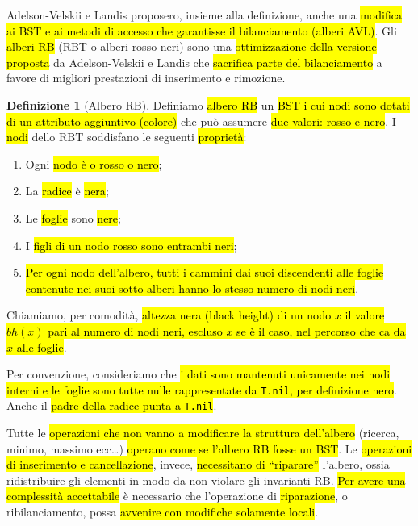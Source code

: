 \documentclass[a4paper,11pt,twoside]{article}
\theoremstyle{plain}
\theoremstyle{definition}
\newtheorem{defn}{Definizione}[section]
\theoremstyle{remark}
\begin{document}
Adelson-Velskii e Landis proposero, insieme alla definizione, anche una
\hl{modifica ai BST e ai metodi di accesso che garantisse il bilanciamento
(alberi AVL)}. Gli \hl{alberi RB} (RBT o alberi rosso-neri) sono una
\hl{ottimizzazione della versione proposta} da Adelson-Velskii e Landis che
\hl{sacrifica parte del bilanciamento} a favore di migliori prestazioni di
inserimento e rimozione.

\begin{defn}[Albero RB]\label{def:rbt}
  Definiamo \hl{albero RB} un \hl{BST i cui nodi sono dotati di un attributo aggiuntivo
  (colore)} che può assumere \hl{due valori: rosso e nero}. I \hl{nodi} dello RBT
  soddisfano le seguenti \hl{proprietà}:

  \begin{enumerate}
    \item Ogni \hl{nodo è o rosso o nero};
    \item La \hl{radice} è \hl{nera};
    \item Le \hl{foglie} sono \hl{nere};
    \item I \hl{figli di un nodo rosso sono entrambi neri};
    \item \hl{Per ogni nodo dell'albero, tutti i cammini dai suoi discendenti
      alle foglie contenute nei suoi sotto-alberi hanno lo stesso numero di nodi
      neri}.
  \end{enumerate}
\end{defn}

Chiamiamo, per comodità, \hl{altezza nera (black height) di un nodo $x$ il
valore $bh(x)$ pari al numero di nodi neri, escluso $x$ se è il caso, nel
percorso che ca da $x$ alle foglie}.

Per convenzione, consideriamo che \hl{i dati sono mantenuti unicamente nei nodi
interni e le foglie sono tutte nulle rappresentate da \texttt{T.nil}, per
definizione nero}. Anche il \hl{padre della radice punta a \texttt{T.nil}}.

Tutte le \hl{operazioni che non vanno a modificare la struttura dell'albero}
(ricerca, minimo, massimo ecc\ldots) \hl{operano come se l'albero RB fosse un
BST}. Le \hl{operazioni di inserimento e cancellazione}, invece,
\hl{necessitano di ``riparare''} l'albero, ossia ridistribuire gli elementi in
modo da non violare gli invarianti RB. \hl{Per avere una complessità
accettabile} è necessario che l'operazione di \hl{riparazione}, o
ribilanciamento, possa \hl{avvenire con modifiche solamente locali}.
\end{document}
